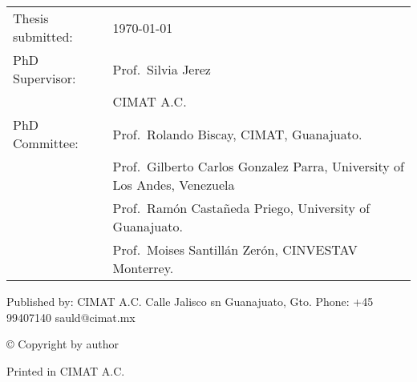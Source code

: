 \thispagestyle{empty}
\noindent
\begin{tabularx}{\textwidth}{@{}lX}
    Thesis submitted:	& \today\\
    PhD Supervisor:		& Prof.\ Silvia Jerez\\
					    & CIMAT A.C.\\
    PhD Committee:		& Prof.\ Rolando Biscay, CIMAT, Guanajuato. \\
					    & Prof.\ Gilberto Carlos Gonzalez Parra,
					    University of Los Andes, Venezuela\\						
						& Prof.\ Ram\'on Casta\~{n}eda Priego, University of Guanajuato.\\
						& Prof.\ Moises Santill\'an Zer\'on, CINVESTAV Monterrey. \\
						
						
\end{tabularx}
\strut\vfill
\noindent
	\noindent Published by:\newline
	CIMAT A.C. \newline
	Calle Jalisco sn\newline
	Guanajuato, Gto.\newline
	Phone: +45 99407140\newline
	sauld@cimat.mx\newline
	\strut\vfill
	\noindent \copyright{} Copyright by author\newline
	\strut\vfill
	\noindent Printed in CIMAT A.C. 
	\strut\vfill\vfill\vfill
	\clearpage

